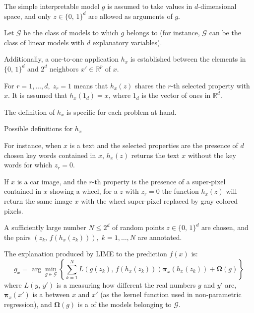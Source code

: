 The simple interpretable model $g$ is assumed to take values in
$d$-dimensional space, and only $z \in \{0,\, 1\}^d$ are allowed as arguments
of $g$.

Let $\mathcal G$ be the class of models to which $g$ belongs to (for instance, $\mathcal G$
can be the class of linear models with $d$ explanatory variables).

Additionally, a one-to-one application $h_x$ is established between the
elements in $\{0,\, 1\}^d$ and $2^d$ neighbors $x' \in \mathds R^p$ of $x$.

For $r = 1, \ldots , d,\; z_r = 1$ means that $h_x (z)$ shares the $r$-th selected
property with $x$. It is assumed that $h_x (1_d) = x$, where $1_d$ is the
vector of ones in $\mathds R^d$.

\begin{note}
	The definition of $h_x$ is specific for each problem at hand.
\end{note}

\begin{example}{Possible definitions for $h_x$}{}

	For instance, when $x$ is a text and the selected properties are the
	presence of $d$ chosen key words contained in $x$, $h_x (z)$ returns the
	text $x$ without the key words for which $z_r = 0$.

	If $x$ is a car image, and the $r$-th property is the presence of a
	super-pixel contained in $x$ showing a wheel, for a $z$ with $z_r = 0$ the
	function $h_x (z)$ will return the same image $x$ with the wheel
	super-pixel replaced by gray colored pixels.
\end{example}

A sufficiently large number $N \leq 2^d$ of random points $z \in \{0,\, 1\}^d$ are
chosen, and the pairs $\left(z_k,\, f(h_x(z_k)) \right),\; k = 1, \ldots , N$ are annotated.

The explanation produced by LIME to the prediction $f(x)$ is:
\begin{equation*}
	g_x = \arg \min_{g \in \mathcal G} \left\{
	\sum_{k = 1}^N L \left(g(z_k),\, f(h_x(z_k)) \right) \boldsymbol \pi_x(h_x(z_k)) + \boldsymbol\Omega(g)
	\right\}
\end{equation*}
where $L(y,\,y')$ is a  measuring how different the real numbers $y$ and
$y'$ are, $\boldsymbol \pi_x(x')$ is a  between $x$ and $x'$
(as the kernel function used in non-parametric regression), and $\boldsymbol\Omega(g)$ is a
 of the models belonging to $\mathcal G$.

